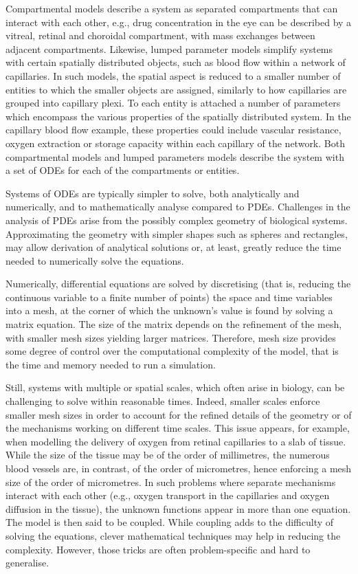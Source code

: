 \documentclass{article}
\begin{document}
Compartmental models describe a system as separated compartments that can interact with each other, e.g., drug concentration in the eye can be described by a vitreal, retinal and choroidal compartment, with mass exchanges between adjacent compartments.
Likewise, lumped parameter models simplify systems with certain spatially distributed objects, such as blood flow within a network of capillaries.
In such models, the spatial aspect is reduced to a smaller number of entities to which the smaller objects are assigned, similarly to how capillaries are grouped into capillary plexi.
To each entity is attached a number of parameters which encompass the various properties of the spatially distributed system.
In the capillary blood flow example, these properties could include vascular resistance, oxygen extraction or storage capacity within each capillary of the network.
Both compartmental models and lumped parameters models describe the system with a set of ODEs for each of the compartments or entities.

Systems of ODEs are typically simpler to solve, both analytically and numerically, and to mathematically analyse compared to PDEs.
Challenges in the analysis of PDEs arise from the possibly complex geometry of biological systems.
Approximating the geometry with simpler shapes such as spheres and rectangles, may allow derivation of analytical solutions or, at least, greatly reduce the time needed to numerically solve the equations.

Numerically, differential equations are solved by discretising (that is, reducing the continuous variable to a finite number of points) the space and time variables into a mesh, at the corner of which the unknown's value is found by solving a matrix equation.
The size of the matrix depends on the refinement of the mesh, with smaller mesh sizes yielding larger matrices.
Therefore, mesh size provides some degree of control over the computational complexity of the model, that is the time and memory needed to run a simulation.

Still, systems with multiple or spatial scales, which often arise in biology, can be challenging to solve within reasonable times.
Indeed, smaller scales enforce smaller mesh sizes in order to account for the refined details of the geometry or of the mechanisms working on different time scales.
This issue appears, for example, when modelling the delivery of oxygen from retinal capillaries to a slab of tissue.
While the size of the tissue may be of the order of millimetres, the numerous blood vessels are, in contrast, of the order of micrometres, hence enforcing a mesh size of the order of micrometres.
In such problems where separate mechanisms interact with each other (e.g., oxygen transport in the capillaries and oxygen diffusion in the tissue), the unknown functions appear in more than one equation.
The model is then said to be coupled.
While coupling adds to the difficulty of solving the equations, clever mathematical techniques may help in reducing the complexity.
However, those tricks are often problem-specific and hard to generalise.
\end{document}

